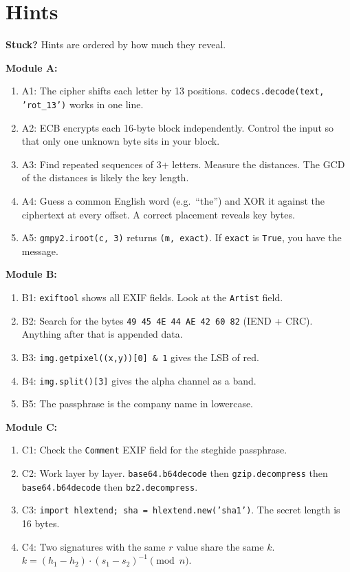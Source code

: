 \documentclass[a4paper, 12pt]{article}
\begin{document}
\section{Hints}

\begin{mdframed}[backgroundcolor=labgray, linecolor=labpurple, linewidth=0.5pt]
\textbf{Stuck?} Hints are ordered by how much they reveal.

\textbf{Module A:}
\begin{enumerate}[leftmargin=2em, topsep=4pt]
  \item A1: The cipher shifts each letter by 13 positions.
        \texttt{codecs.decode(text, 'rot\_13')} works in one line.
  \item A2: ECB encrypts each 16-byte block independently. Control the input
        so that only one unknown byte sits in your block.
  \item A3: Find repeated sequences of 3+ letters. Measure the distances.
        The GCD of the distances is likely the key length.
  \item A4: Guess a common English word (e.g.\ ``the'') and XOR it against the
        ciphertext at every offset. A correct placement reveals key bytes.
  \item A5: \texttt{gmpy2.iroot(c, 3)} returns \texttt{(m, exact)}.
        If \texttt{exact} is \texttt{True}, you have the message.
\end{enumerate}

\textbf{Module B:}
\begin{enumerate}[leftmargin=2em, topsep=4pt]
  \item B1: \texttt{exiftool} shows all EXIF fields. Look at the \texttt{Artist} field.
  \item B2: Search for the bytes \texttt{49 45 4E 44 AE 42 60 82} (IEND + CRC).
        Anything after that is appended data.
  \item B3: \texttt{img.getpixel((x,y))[0] \& 1} gives the LSB of red.
  \item B4: \texttt{img.split()[3]} gives the alpha channel as a band.
  \item B5: The passphrase is the company name in lowercase.
\end{enumerate}

\textbf{Module C:}
\begin{enumerate}[leftmargin=2em, topsep=4pt]
  \item C1: Check the \texttt{Comment} EXIF field for the steghide passphrase.
  \item C2: Work layer by layer. \texttt{base64.b64decode} then \texttt{gzip.decompress}
        then \texttt{base64.b64decode} then \texttt{bz2.decompress}.
  \item C3: \texttt{import hlextend; sha = hlextend.new('sha1')}. The secret length is 16 bytes.
  \item C4: Two signatures with the same $r$ value share the same $k$.
        $k = (h_1 - h_2) \cdot (s_1 - s_2)^{-1} \pmod{n}$.
\end{enumerate}
\end{mdframed}
\end{document}
